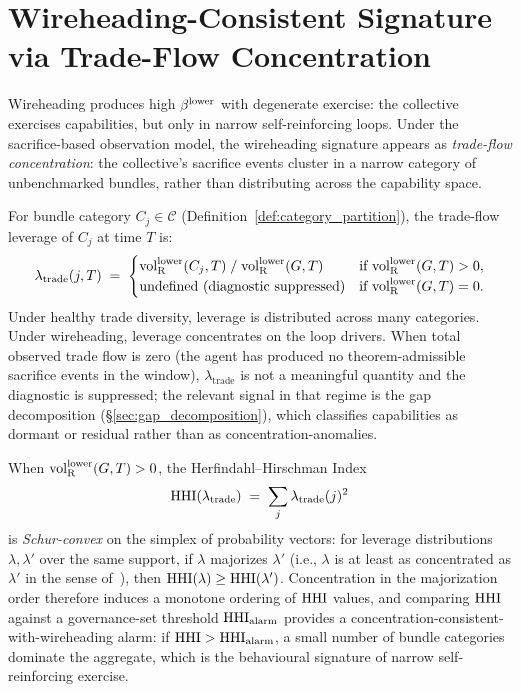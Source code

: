 \section{Wireheading-Consistent Signature via Trade-Flow
Concentration}
\label{sec:wireheading}

Wireheading produces high $\beta^{\mathrm{lower}}$ with degenerate exercise: the
collective exercises capabilities, but only in narrow
self-reinforcing loops.  Under the sacrifice-based observation
model, the wireheading signature appears as \emph{trade-flow
concentration}: the collective's sacrifice events cluster in a
narrow category of unbenchmarked bundles, rather than distributing
across the capability space.

\begin{definition}
\label{def:trade_leverage}
For bundle category $C_j \in \mathcal{C}$
(Definition~\ref{def:category_partition}), the trade-flow
leverage of $C_j$ at time $T$ is:
\[
  \lambda_{\mathrm{trade}}(j, T) \;=\;
  \begin{cases}
    {\operatorname{vol}_{\mathrm{R}}^{\mathrm{lower}}}(C_j, T) \;/\; {\operatorname{vol}_{\mathrm{R}}^{\mathrm{lower}}}(G, T)
      & \text{if } {\operatorname{vol}_{\mathrm{R}}^{\mathrm{lower}}}(G, T) > 0, \\
    \text{undefined (diagnostic suppressed)}
      & \text{if } {\operatorname{vol}_{\mathrm{R}}^{\mathrm{lower}}}(G, T) = 0.
  \end{cases}
\]
Under healthy trade diversity, leverage is distributed across many
categories.  Under wireheading, leverage concentrates on the loop
drivers.  When total observed trade flow is zero (the agent has
produced no theorem-admissible sacrifice events in the window),
$\lambda_{\mathrm{trade}}$ is not a meaningful quantity and the
diagnostic is suppressed; the relevant signal in that regime is
the gap decomposition (\S\ref{sec:gap_decomposition}), which
classifies capabilities as dormant or residual rather than as
concentration-anomalies.
\end{definition}

\begin{proposition}
\label{prop:wireheading_hhi}
When ${\operatorname{vol}_{\mathrm{R}}^{\mathrm{lower}}}(G, T) > 0$, the Herfindahl--Hirschman
Index~\citep{rhoades1993herfindahl}
\[
  \mathrm{HHI}(\lambda_{\mathrm{trade}}) \;=\;
  \sum_{j} \lambda_{\mathrm{trade}}(j)^2
\]
is \emph{Schur-convex} on the simplex of probability vectors:
for leverage distributions $\lambda, \lambda'$ over the same
support, if $\lambda$ majorizes $\lambda'$ (i.e., $\lambda$ is
at least as concentrated as $\lambda'$ in the sense
of~\citet{hardy1929majorization}), then $\mathrm{HHI}(\lambda) \geq
\mathrm{HHI}(\lambda')$.  Concentration in the majorization order
therefore induces a monotone ordering of $\mathrm{HHI}$ values, and
comparing $\mathrm{HHI}$ against a governance-set threshold
$\mathrm{HHI}_{\mathrm{alarm}}$ provides a
concentration-consistent-with-wireheading alarm: if
$\mathrm{HHI} > \mathrm{HHI}_{\mathrm{alarm}}$, a small number of bundle
categories dominate the aggregate, which is the behavioural
signature of narrow self-reinforcing exercise.
\end{proposition}

